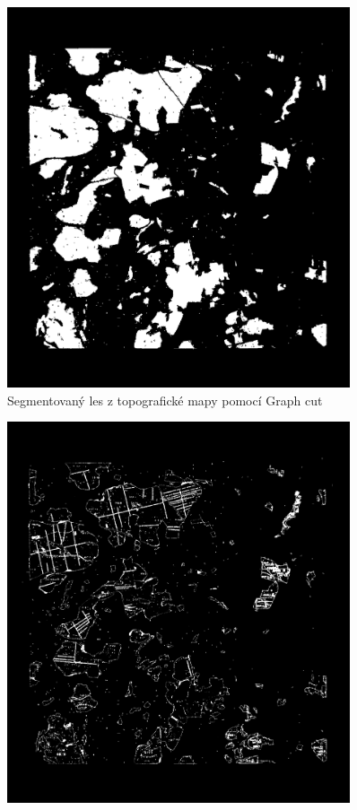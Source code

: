 \begin{itemize}
\begin{figure}[H]
            \includegraphics[width=0.9\textwidth]{images/Les_Graph_Cut_BW.jpg}
            \caption{Segmentovaný les z topografické mapy pomocí Graph cut}
        \end{figure}
        \begin{figure}[H]
            \centering
            \includegraphics[width=0.9\textwidth]{images/difference.jpg}

\end{figure}
\end{itemize}
